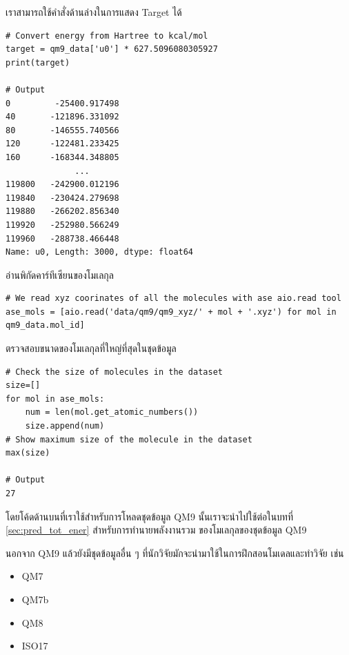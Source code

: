 \noindent เราสามารถใช้คำสั่งด้านล่างในการแสดง Target ได้

\begin{lstlisting}[style=MyPython]
# Convert energy from Hartree to kcal/mol
target = qm9_data['u0'] * 627.5096080305927 
print(target)

# Output
0         -25400.917498
40       -121896.331092
80       -146555.740566
120      -122481.233425
160      -168344.348805
              ...      
119800   -242900.012196
119840   -230424.279698
119880   -266202.856340
119920   -252980.566249
119960   -288738.466448
Name: u0, Length: 3000, dtype: float64
\end{lstlisting}

\noindent อ่านพิกัดคาร์ทีเซียนของโมเลกุล

\begin{lstlisting}[style=MyPython]
# We read xyz coorinates of all the molecules with ase aio.read tool
ase_mols = [aio.read('data/qm9/qm9_xyz/' + mol + '.xyz') for mol in qm9_data.mol_id]
\end{lstlisting}

\noindent ตรวจสอบขนาดของโมเลกุลที่ใหญ่ที่สุดในชุดข้อมูล

\begin{lstlisting}[style=MyPython]
# Check the size of molecules in the dataset
size=[]
for mol in ase_mols:
    num = len(mol.get_atomic_numbers())
    size.append(num)
# Show maximum size of the molecule in the dataset
max(size)

# Output
27
\end{lstlisting}

โดยโค้ดด้านบนที่เราใช้สำหรับการโหลดชุดข้อมูล QM9 นั้นเราจะนำไปใช้ต่อในบทที่ \ref{sec:pred_tot_ener} สำหรับการทำนายพลังงานรวม%
ของโมเลกุลของชุดข้อมูล QM9

นอกจาก QM9 แล้วยังมีชุดข้อมูลอื่น ๆ ที่นักวิจัยมักจะนำมาใช้ในการฝึกสอนโมเดลและทำวิจัย เช่น 

\begin{itemize}[topsep=0pt]
    \item QM7\autocite{blum2009,rupp2012}
    
    \item QM7b\autocite{blum2009,montavon2013}
    
    \item QM8\autocite{ruddigkeit2012,ramakrishnan2015}
    
    \item ISO17\autocite{schutt2017,schutt2017a,ramakrishnan2014}
\end{itemize}

